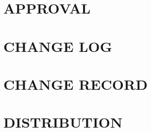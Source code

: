 

\section*{APPROVAL}
\approvaltable

\section*{CHANGE LOG}
\changelogtable

\section*{CHANGE RECORD}
\recordtable

\newpage
\section*{DISTRIBUTION}
\distributiontable